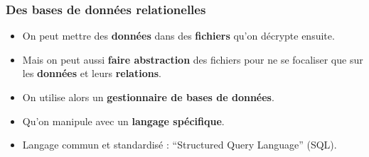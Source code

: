 \subsubsection{Des bases de données relationelles}
\begin{slide}
	\begin{itemize}
		\item On peut mettre des \textbf{données} dans des \textbf{fichiers} qu'on décrypte ensuite.
		\item Mais on peut aussi \textbf{faire abstraction} des fichiers pour ne se focaliser que sur les \textbf{données} et leurs \textbf{relations}.
	\end{itemize}
\end{slide}

\begin{slide}
	\begin{itemize}
		\item On utilise alors un \textbf{gestionnaire de bases de données}.
		\item Qu'on manipule avec un \textbf{langage spécifique}.
		\item Langage commun et standardisé : \enquote{Structured Query Language} (SQL).
	\end{itemize}
\end{slide}

